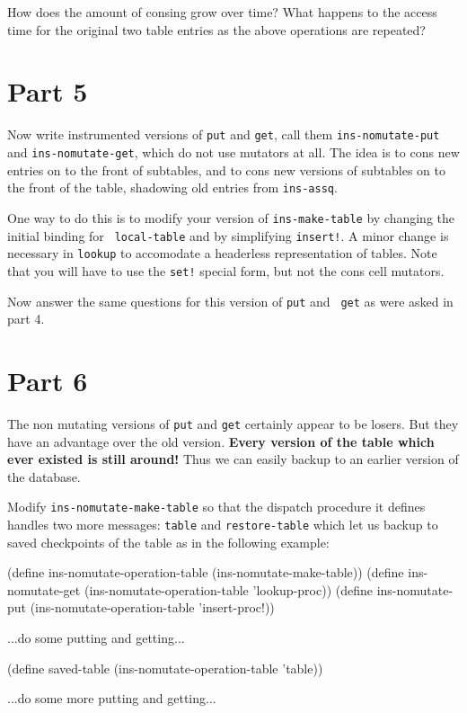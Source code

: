 \noindent How does the amount of consing grow over time?  What happens
to the access time for the original two table entries as the above
operations are repeated?

\section{Part 5}

Now write instrumented versions of {\tt put} and {\tt get}, call them
{\tt ins-nomutate-put} and {\tt ins-nomutate-get}, which do not use
mutators at all.  The idea is to cons new entries on to the front of
subtables, and to cons new versions of subtables on to the front of the
table, shadowing old entries from {\tt ins-assq}.

 One way to do this is to modify your version of
{\tt ins-make-table} by changing the initial binding for {\tt
local-table} and by simplifying {\tt insert!}.  A minor change is
necessary in {\tt lookup} to accomodate a headerless representation of
tables.  Note that you will have to use the {\tt set!} special form, but
not the cons cell mutators.

Now answer the same questions for this version of {\tt put} and {\tt
get} as were asked in part 4.

\section{Part 6}

The non mutating versions of {\tt put} and {\tt get} certainly appear to
be losers.  But they have an advantage over the old version.  {\bf Every
version of the table which ever existed is still around!}  Thus we can
easily backup to an earlier version of the database.

Modify {\tt ins-nomutate-make-table} so that the dispatch procedure it
defines handles two more messages: {\tt table} and {\tt restore-table}
which let us backup to saved checkpoints of the table as in the
following example:

\beginlisp
(define ins-nomutate-operation-table (ins-nomutate-make-table))
(define ins-nomutate-get (ins-nomutate-operation-table 'lookup-proc))
(define ins-nomutate-put (ins-nomutate-operation-table 'insert-proc!))

...do some putting and getting...

(define saved-table (ins-nomutate-operation-table 'table))

...do some more putting and getting...

